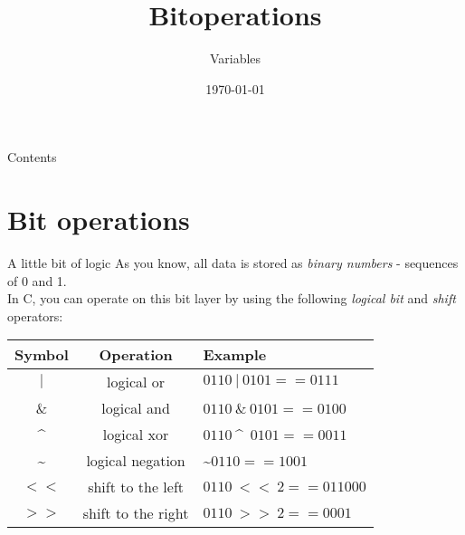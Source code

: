 


\title{Bitoperations}
\subtitle{Variables}
\date{\today}





\maketitle


\begin{frame}{Contents}
	\tableofcontents
\end{frame}

\section{Bit operations}

\begin{frame}{A little bit of logic}
	As you know, all data is stored as \textit{binary numbers} - sequences of 0 and 1.\\
	In C, you can operate on this bit layer by using the following \textit{logical bit} and \textit{shift} operators:\bigskip
	
	\begin{tabular}{|c|c|l|}
																						  	  \hline
		\textbf{Symbol} 	& \textbf{Operation} 	& \textbf{Example} 							\\\hline
		$|$					& logical or				& $0110\ |\ 0101 == 0111$ 		\\\hline
		$\&$ 				& logical and 				& $0110\ \&\ 0101 == 0100$ 	\\\hline
		\textasciicircum				& logical xor 				& $0110\ $\textasciicircum\ $0101 == 0011$ 	\\\hline
		\textasciitilde			& logical negation 			& \textasciitilde $0110 == 1001$	\\\hline
		$<<$ 			& shift to the left 			& $0110\ <<\ 2 == 011000$ 	\\\hline
		$>>$ 		& shift to the right 				& $0110\ >>\ 2 == 0001$ 			\\\hline
	\end{tabular}
	
\end{frame}

